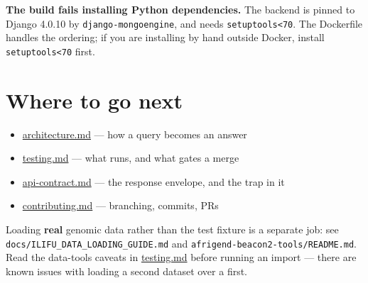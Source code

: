 \documentclass[
  10pt,
]{article}
\providecommand{\tightlist}{%
  \setlength{\itemsep}{0pt}\setlength{\parskip}{0pt}}
\begin{document}
\textbf{The build fails installing Python dependencies.} The backend is
pinned to Django 4.0.10 by \texttt{django-mongoengine}, and needs
\texttt{setuptools\textless{}70}. The Dockerfile handles the ordering;
if you are installing by hand outside Docker, install
\texttt{setuptools\textless{}70} first.

\section{Where to go next}\label{where-to-go-next}

\begin{itemize}
\tightlist
\item
  \url{architecture.md} --- how a query becomes an answer
\item
  \url{testing.md} --- what runs, and what gates a merge
\item
  \url{api-contract.md} --- the response envelope, and the trap in it
\item
  \url{contributing.md} --- branching, commits, PRs
\end{itemize}

Loading \textbf{real} genomic data rather than the test fixture is a
separate job: see \texttt{docs/ILIFU\_DATA\_LOADING\_GUIDE.md} and
\texttt{afrigend-beacon2-tools/README.md}. Read the data-tools caveats
in \url{testing.md} before running an import --- there are known issues
with loading a second dataset over a first.
\end{document}
